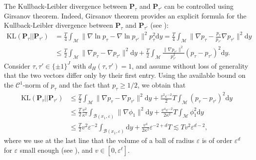 \documentclass[10pt,a4paper]{article}
\renewcommand{\P}{{\mathbf P}}
\newcommand\cB{\mathcal{B}}
\newcommand\cC{\mathcal{C}}
\newcommand\cM{\mathcal{M}}
\newcommand\dd{\mathrm{d}}
\newcommand{\eps}{{\varepsilon}}
\begin{document}
The Kullback-Leibler divergence between $\P_{\tau}$ and $\P_{\tau'} $ can be controlled using Girsanov theorem. Indeed,  Girsanov theorem provides an explicit formula for the Kullback-Leibler divergence between $\P_{\tau}$ and $\P_{\tau'}$ (see ):
\begin{align*}
    \mathrm{KL}(\P_{\tau} || \P_{\tau'} ) &= \frac T4 \int_{\cM} \|\nabla \ln p_\tau - \nabla \ln p_{\tau'}\|^2 p_\tau^2 \dd y = \frac T4 \int_{\cM} \|\nabla p_\tau -\frac {p_\tau} {p_{\tau'}} \nabla p_{\tau'}\|^2 \dd y \\
    &\le  \frac T2 \int_{\cM} \|\nabla p_\tau - \nabla p_{\tau'}\|^2 \dd y+  \frac T2 \int_{\cM} \frac{\|\nabla p_{\tau'}\|^2}{p_{\tau'}^2}(p_\tau-p_{\tau'})^2\dd y.
\end{align*}
Consider $\tau,\tau'\in \{\pm 1\}^J$ with $d_H(\tau,\tau')=1$, and assume without loss of generality that the two vectors differ only by their first entry. 
Using the available bound on the  $\cC^1$-norm of $p_\tau$ and the fact that $p_{\tau}\ge 1/2$, we obtain that
\begin{align*}
    \mathrm{KL}(\P_{\tau} || \P_{\tau'} )
    &\le \frac T2 \int_{\cM} \|\nabla p_\tau - \nabla p_{\tau'}\|^2 \dd y  + \frac{v^2\eps^{-2}}{2}T \int_{\cM} ( p_\tau -  p_{\tau'})^2 \dd y \\
&\le \frac T2 \frac{v^2}{\kappa^2} \int_{\cB(x_1,\eps)} \|\nabla \phi_1\|^2  \dd y+ \frac{v^4\eps^{-2}}{2\kappa^2} T \int_{\cM} \phi_1^2 \dd y\\
&\le \frac T2 v^2\eps^{-2} \int_{\cB(x_1,\eps)}\dd y  + \frac{v^4}{2\kappa^2}
\eps^{-2+d} T  \lesssim T v^2\eps^{d-2},
\end{align*}
where we use at the last line that the volume of a ball of radius $\eps$ is of order $\eps^d$ for $\eps$ small enough (see ), and $v\in[0,\eps^\ell]$. 
\end{document}
